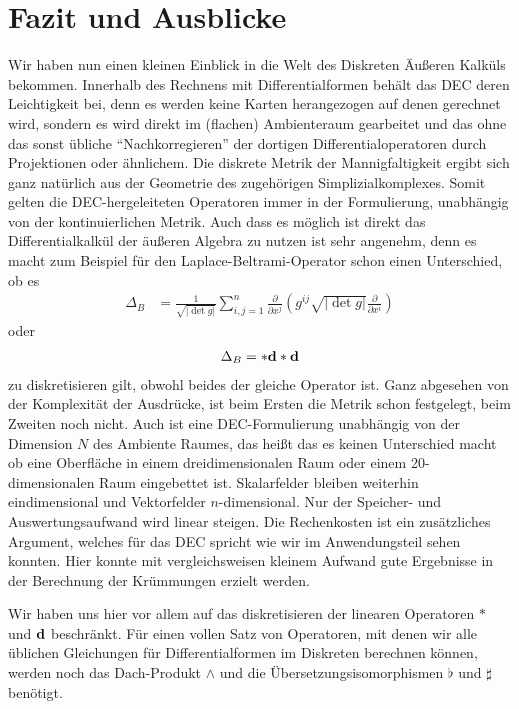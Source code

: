 \chapter{Fazit und Ausblicke}

Wir haben nun einen kleinen Einblick in die Welt des Diskreten Äußeren Kalküls bekommen.
Innerhalb des Rechnens mit Differentialformen behält das DEC deren Leichtigkeit bei,
denn es werden keine Karten herangezogen auf denen gerechnet wird, sondern es wird direkt im (flachen) Ambienteraum gearbeitet und das ohne
das sonst übliche "`Nachkorregieren"' der dortigen Differentialoperatoren durch Projektionen oder ähnlichem.
Die diskrete Metrik der Mannigfaltigkeit ergibt sich ganz natürlich aus der Geometrie des zugehörigen Simplizialkomplexes.
Somit gelten die DEC-hergeleiteten Operatoren immer in der Formulierung, unabhängig von der kontinuierlichen Metrik.
Auch dass es möglich ist direkt das Differentialkalkül der äußeren Algebra zu nutzen ist sehr angenehm, denn es macht zum Beispiel für den
Laplace-Beltrami-Operator schon einen Unterschied, ob es 
    \begin{align}
      \Delta_{B} &= \frac{1}{\sqrt{\left| \det g \right|}} \sum_{i,j=1}^{n} \frac{\partial}{\partial x^{j}} \left( g^{ij}\sqrt{\left| \det g \right|} \frac{\partial }{\partial x^{i}}
      \right)
    \end{align}
oder
  \begin{align}
    \Delta_{B} = *\mathbf{d} *\mathbf{d}
  \end{align}
zu diskretisieren gilt, obwohl beides der gleiche Operator ist.
Ganz abgesehen von der Komplexität der Ausdrücke, ist beim Ersten die Metrik schon festgelegt, beim Zweiten noch nicht.
Auch ist eine DEC-Formulierung unabhängig von der Dimension \( N \) des Ambiente Raumes, das heißt das es keinen Unterschied macht ob eine
Oberfläche in einem dreidimensionalen Raum oder einem 20-dimensionalen Raum eingebettet ist.
Skalarfelder bleiben weiterhin eindimensional und Vektorfelder \( n \)-dimensional.
Nur der Speicher- und Auswertungsaufwand wird linear steigen.
Die Rechenkosten ist ein zusätzliches Argument, welches für das DEC spricht wie wir im Anwendungsteil sehen konnten.
Hier konnte mit vergleichsweisen kleinem Aufwand gute Ergebnisse in der Berechnung der Krümmungen erzielt werden.

Wir haben uns hier vor allem auf das diskretisieren der linearen Operatoren \( * \) und \( \mathbf{d} \) beschränkt.
Für einen vollen Satz von Operatoren, mit denen wir alle üblichen Gleichungen für Differentialformen im Diskreten berechnen können, werden noch
das Dach-Produkt \( \wedge  \) und die Übersetzungsisomorphismen \( \flat \) und \( \sharp \) benötigt.

